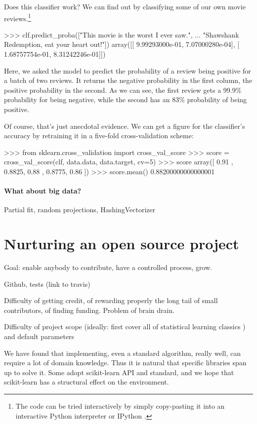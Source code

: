 \documentclass[a4paper]{article}
\begin{document}
Does this classifier work?
We can find out by classifying some of our own movie reviews.\footnote{
  The code can be tried interactively by simply copy-pasting it
  into an interactive Python interpreter or IPython \cite{perez2007ipython}.
}

\begin{pythoncode}
>>> clf.predict\_proba(["This movie is the worst I ever saw.",
...                    "Shawshank Redemption, eat your heart out!"])
array([[  9.99293000e-01,   7.07000280e-04],
       [  1.68757754e-01,   8.31242246e-01]])
\end{pythoncode}

Here, we asked the model to predict the probability of a review being positive
for a batch of two reviews. It returns the negative probability in the first
column, the positive probability in the second.
As we can see, the first review gets a 99.9\% probability for being negative,
while the second has an 83\% probability of being positive.

Of course, that's just anecdotal evidence. We can get a figure for the
classifier's accuracy by retraining it in a five-fold cross-validation scheme:

\begin{pythoncode}
>>> from sklearn.cross\_validation import cross\_val\_score
>>> score = cross\_val\_score(clf, data.data, data.target, cv=5)
>>> score
array([ 0.91  ,  0.8825,  0.88  ,  0.8775,  0.86  ])
>>> score.mean()
0.88200000000000001
\end{pythoncode}

\paragraph{What about big data?}
%
Partial fit, random projections, HashingVectorizer

\section{Nurturing an open source project}

Goal: enable anybody to contribute, have a controlled process, grow.

Github, tests (link to travis)

Difficulty of getting credit, of rewarding properly the long tail of small
contributors, of finding funding. Problem of brain drain.

Difficulty of project scope (ideally: first cover all of statistical
learning classics \cite{elemstatlearn}) and default parameters

We have found that implementing, even a standard algorithm, really well,
can require a lot of domain knowledge. Thus it is natural that specific
libraries span up to solve it. Some adopt scikit-learn API and standard,
and we hope that scikit-learn has a structural effect on the environment.

\small


\end{document}
